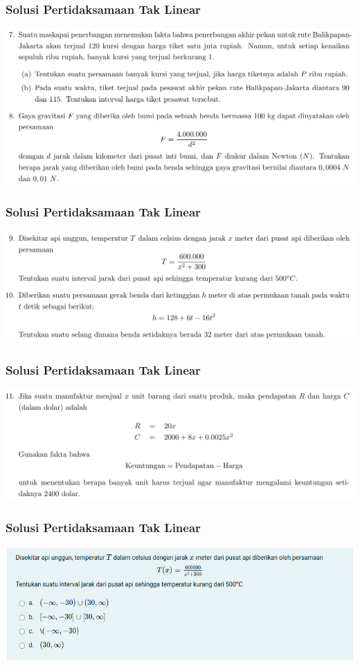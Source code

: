 \documentclass[pdflatex,compress,mathserif]{beamer}
\begin{document}
\begin{frame}
	\frametitle{Solusi Pertidaksamaan Tak Linear}
	\begin{center}
		\includegraphics[width=\linewidth]{img/img23}
	\end{center}
\end{frame}

\begin{frame}
	\frametitle{Solusi Pertidaksamaan Tak Linear}
	\begin{center}
		\includegraphics[width=\linewidth]{img/img24}
	\end{center}
\end{frame}

\begin{frame}
	\frametitle{Solusi Pertidaksamaan Tak Linear}
	\begin{center}
		\includegraphics[width=\linewidth]{img/img25}
	\end{center}
\end{frame}

\begin{frame}
	\frametitle{Solusi Pertidaksamaan Tak Linear}
	\begin{center}
		\includegraphics[width=\linewidth]{img/img26}
	\end{center}
\end{frame}
\end{document}
